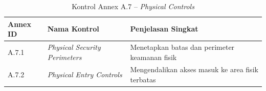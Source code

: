 \begin{table}[H]
\centering
\small
\caption{Kontrol Annex A.7 -- \textit{Physical Controls} \cite{isoiec20227001}}
\label{tab:annex_a7}
\begin{tabular}{|P{1.6cm}|P{5.0cm}|P{6.4cm}|}
\hline
\textbf{Annex ID} & \textbf{Nama Kontrol} & \textbf{Penjelasan Singkat} \\
\hline
A.7.1  & \textit{Physical Security Perimeters}                          & Menetapkan batas dan perimeter keamanan fisik \\
\hline
A.7.2  & \textit{Physical Entry Controls}                               & Mengendalikan akses masuk ke area fisik terbatas \\
\hline
\end{tabular}
\end{table}

